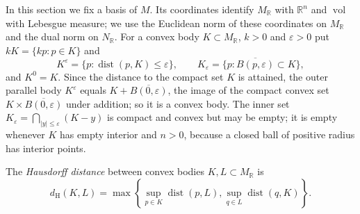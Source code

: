 In this section we fix a basis of $M$. Its coordinates identify $M_{\mathbb R}$ with $\mathbb R^n$ and $\operatorname{vol}$ with Lebesgue measure; we use the Euclidean norm of these coordinates on $M_{\mathbb R}$ and the dual norm on $N_{\mathbb R}$. For a convex body $K\subset M_{\mathbb R}$, $k>0$ and $\varepsilon>0$ put $kK=\{kp:p\in K\}$ and
\[
 K^\varepsilon=\{p:\operatorname{dist}(p,K)\leq\varepsilon\},
 \qquad K_\varepsilon=\{p:\overline{B(p,\varepsilon)}\subset K\},
\]
and $K^0=K$. Since the distance to the compact set $K$ is attained, the outer parallel body $K^\varepsilon$ equals $K+\overline{B(0,\varepsilon)}$, the image of the compact convex set $K\times\overline{B(0,\varepsilon)}$ under addition; so it is a convex body. The inner set $K_\varepsilon=\bigcap_{|y|\leq\varepsilon}(K-y)$ is compact and convex but may be empty; it is empty whenever $K$ has empty interior and $n>0$, because a closed ball of positive radius has interior points.

\begin{definition}\label{def:hausdorff-convex-body-distance}
The \emph{Hausdorff distance} between convex bodies $K,L\subset M_{\mathbb R}$ is
\[
 d_{\mathrm H}(K,L)=\max\left\{\sup_{p\in K}\operatorname{dist}(p,L),
                       \sup_{q\in L}\operatorname{dist}(q,K)\right\}.
\]
\end{definition}

